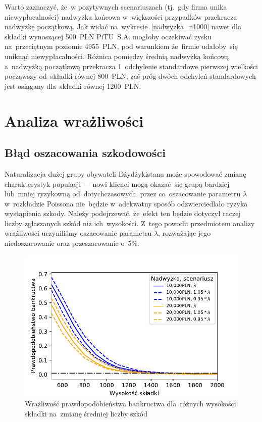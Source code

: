 \documentclass[12pt, a4paper, oneside]{mwart} %
\begin{document}
Warto zaznaczyć, że~w pozytywnych scenariuszach (tj.~gdy firma unika niewypłacalności) nadwyżka końcowa w~większości przypadków przekracza nadwyżkę początkową. Jak widać na~wykresie~\ref{nadwyzka_n1000} nawet dla składki wynoszącej 500~PLN PiTU~S.A. mogłoby oczekiwać zysku na~przeciętnym poziomie 4955~PLN, pod warunkiem że~firmie udałoby~się uniknąć niewypłacalności. Różnica pomiędzy średnią nadwyżką końcową a~nadwyżką początkową przekracza 1~odchylenie standardowe pierwszej wielkości począwszy od~składki równej 800~PLN, zaś próg dwóch odchyleń standardowych jest osiągany dla~składki równej 1200~PLN.

\section{Analiza wrażliwości}

\subsection{Błąd oszacowania szkodowości}
Naturalizacja dużej grupy obywateli Dżydżykistanu może spowodować zmianę charakterystyk populacji --- nowi klienci mogą okazać~się grupą bardziej lub~mniej ryzykowną od~dotychczasowych, przez co~oszacowanie parametru $\lambda$ w~rozkładzie Poissona nie~będzie w~adekwatny sposób odzwierciedlało ryzyka wystąpienia szkody. Należy podejrzewać, że~efekt ten będzie dotyczył raczej liczby zgłaszanych szkód niż ich~wysokości. Z~tego powodu przedmiotem analizy wrażliwości uczyniliśmy oszacowanie parametru $\lambda$, rozważając jego niedoszacowanie oraz przeszacowanie o~5\%.

\begin{figure}
\caption{Wrażliwość prawdopodobieństwa bankructwa dla~różnych wysokości składki na~zmianę średniej liczby szkód}
\label{p_bankructwa_all}
\includegraphics[width = \textwidth]{wykresy/p_bankructwa_all.pdf}
\end{figure}
\end{document}
